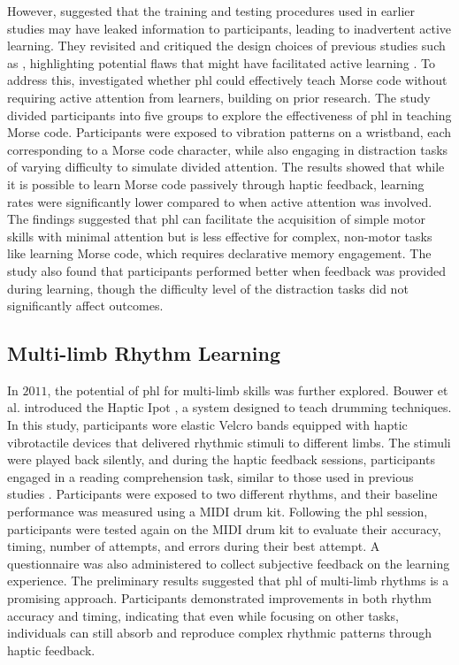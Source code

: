 However, \cite{Pescara2019} suggested that the training and testing procedures used in earlier studies may have leaked information to participants, leading to inadvertent active learning. They revisited and critiqued the design choices of previous studies such as \cite{Seim2016a, Seim2018}, highlighting potential flaws that might have facilitated active learning \cite{Pescara2019}.
To address this, \cite{Pescara2019} investigated whether \gls{phl} could effectively teach Morse code without requiring active attention from learners, building on prior research. The study divided participants into five groups to explore the effectiveness of \gls{phl} in teaching Morse code. Participants were exposed to vibration patterns on a wristband, each corresponding to a Morse code character, while also engaging in distraction tasks of varying difficulty to simulate divided attention.
The results showed that while it is possible to learn Morse code passively through haptic feedback, learning rates were significantly lower compared to when active attention was involved. The findings suggested that \gls{phl} can facilitate the acquisition of simple motor skills with minimal attention but is less effective for complex, non-motor tasks like learning Morse code, which requires declarative memory engagement. The study also found that participants performed better when feedback was provided during learning, though the difficulty level of the distraction tasks did not significantly affect outcomes.

\subsection{Multi-limb Rhythm Learning}
In $2011$, the potential of \gls{phl} for multi-limb skills was further explored. Bouwer et al. \cite{Bouwer2011} introduced the Haptic Ipot \cite{Holland2010, Bouwer2011}, a system designed to teach drumming techniques. In this study, participants wore elastic Velcro bands equipped with haptic vibrotactile devices that delivered rhythmic stimuli to different limbs. The stimuli were played back silently, and during the haptic feedback sessions, participants engaged in a reading comprehension task, similar to those used in previous studies \cite{Huang2008, Huang2010}.
Participants were exposed to two different rhythms, and their baseline performance was measured using a MIDI drum kit. Following the \gls{phl} session, participants were tested again on the MIDI drum kit to evaluate their accuracy, timing, number of attempts, and errors during their best attempt. A questionnaire was also administered to collect subjective feedback on the learning experience.
The preliminary results suggested that \gls{phl} of multi-limb rhythms is a promising approach. Participants demonstrated improvements in both rhythm accuracy and timing, indicating that even while focusing on other tasks, individuals can still absorb and reproduce complex rhythmic patterns through haptic feedback.

